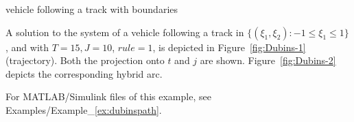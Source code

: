 \begin{example}{vehicle following a track with boundaries}
\label{scr:f}

\label{scr:C}

\label{scr:g}

\label{scr:D}


A solution to the system of a vehicle following a track in $\{(\xi_1,\xi_2):-1\leq \xi_1 \leq1\}$, and with
$T=15, J=10$, $rule =1$, is depicted in Figure~\ref{fig:Dubins-1} (trajectory).  Both the
projection onto $t$ and $j$ are shown. Figure~\ref{fig:Dubins-2} depicts the corresponding
hybrid arc.

For MATLAB/Simulink files of this example, see Examples/Example\_\ref{ex:dubinspath}.

\end{example}

